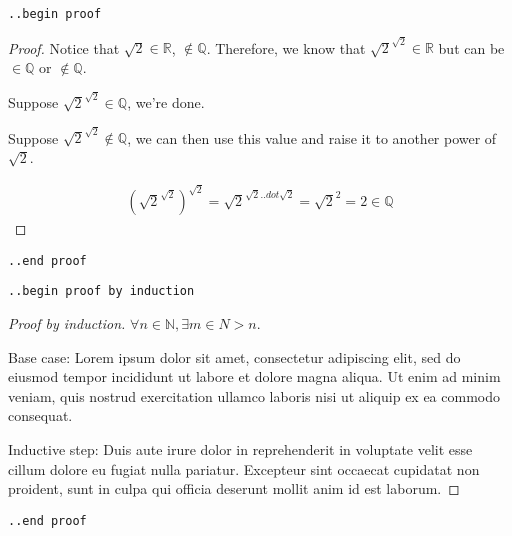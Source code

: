 \documentclass[12pt]{article}
\begin{document}
\begin{flushleft}

\verb|..begin proof|
\begin{proof}

Notice that $\sqrt{2} \in \mathbb{R}$, $\notin \mathbb{Q}$. Therefore, we know that $\sqrt{2}^{\sqrt{2}} \in \mathbb{R}$ but can be $\in \mathbb{Q}$ or $\notin \mathbb{Q}$.

Suppose $\sqrt{2}^{\sqrt{2}} \in \mathbb{Q}$, we're done.

Suppose $\sqrt{2}^{\sqrt{2}} \notin \mathbb{Q}$, we can then use this value and raise it to another power of $\sqrt{2}$.

\begin{gather*}
(\sqrt{2}^{\sqrt{2}})^{\sqrt{2}} = \sqrt{2}^{\sqrt{2} ..dot \sqrt{2}} = \sqrt{2}^2 = 2 \in \mathbb{Q} 
\end{gather*}
\end{proof}
\verb|..end proof|

\bigskip

\verb|..begin proof by induction|
\begin{proof}[Proof by induction]
$\forall n \in \mathbb{N}, \exists m \in N > n.$

\medskip

Base case: Lorem ipsum dolor sit amet, consectetur adipiscing elit, sed do eiusmod tempor incididunt ut labore et dolore magna aliqua. Ut enim ad minim veniam, quis nostrud exercitation ullamco laboris nisi ut aliquip ex ea commodo consequat.

\medskip

Inductive step: Duis aute irure dolor in reprehenderit in voluptate velit esse cillum dolore eu fugiat nulla pariatur. Excepteur sint occaecat cupidatat non proident, sunt in culpa qui officia deserunt mollit anim id est laborum.

\end{proof}
\verb|..end proof|

\end{flushleft}
\end{document}
